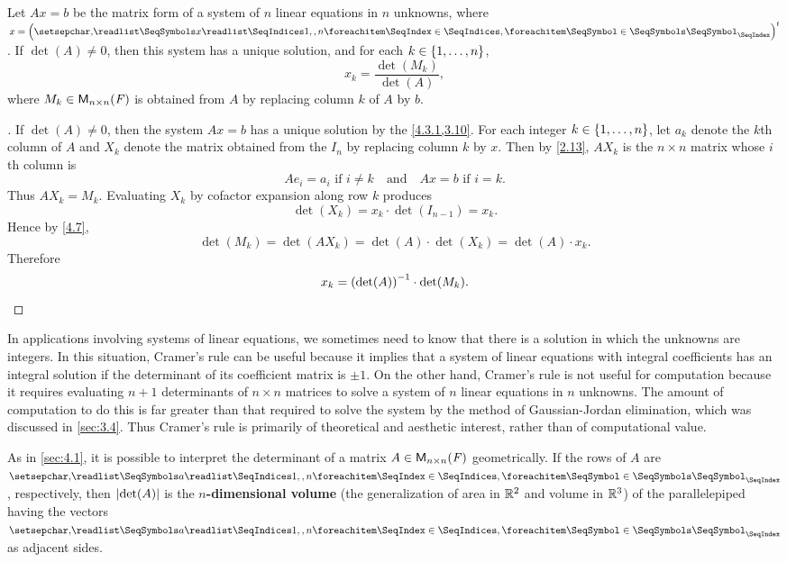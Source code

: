 \begin{thm}\label{4.9}
	Let \(Ax = b\) be the matrix form of a system of \(n\) linear equations in \(n\) unknowns, where \(x = \tp{\tuple{x}{1,,n}}\).
	If \(\det(A) \neq 0\), then this system has a unique solution, and for each \(k \in \left\lbrace1, \dots, n\right\rbrace\),
	\[
		x_k = \frac{\det(M_k)}{\det(A)},
	\]
	where \(M_k \in \mathsf{M}_{{n} \times n}({\mathit{F}})\) is obtained from \(A\) by replacing column \(k\) of \(A\) by \(b\).
\end{thm}

\begin{proof}[]
	If \(\det(A) \neq 0\), then the system \(Ax = b\) has a unique solution by the \cref{4.3.1,3.10}.
	For each integer \(k \in \left\lbrace1, \dots, n\right\rbrace\), let \(a_k\) denote the \(k\)th column of \(A\) and \(X_k\) denote the matrix obtained from the \(I_n\) by replacing column \(k\) by \(x\).
	Then by \cref{2.13}, \(A X_k\) is the \(n \times n\) matrix whose \(i\)th column is
	\[
		A e_i = a_i \text{ if } i \neq k \quad \text{and} \quad Ax = b \text{ if } i = k.
	\]
	Thus \(A X_k = M_k\).
	Evaluating \(X_k\) by cofactor expansion along row \(k\) produces
	\[
		\det(X_k) = x_k \cdot \det(I_{n - 1}) = x_k.
	\]
	Hence by \cref{4.7},
	\[
		\det(M_k) = \det(A X_k) = \det(A) \cdot \det(X_k) = \det(A) \cdot x_k.
	\]
	Therefore
	\[
		x_k = \left\lparen\det(A)\right\rparen^{-1} \cdot \det(M_k).
	\]
\end{proof}

\begin{note}
	In applications involving systems of linear equations, we sometimes need to know that there is a solution in which the unknowns are integers.
	In this situation, Cramer's rule can be useful because it implies that a system of linear equations with integral coefficients has an integral solution if the determinant of its coefficient matrix is \(\pm 1\).
	On the other hand, Cramer's rule is not useful for computation because it requires evaluating \(n + 1\) determinants of \(n \times n\) matrices to solve a system of \(n\) linear equations in \(n\) unknowns.
	The amount of computation to do this is far greater than that required to solve the system by the method of Gaussian-Jordan elimination, which was discussed in \cref{sec:3.4}.
	Thus Cramer's rule is primarily of theoretical and aesthetic interest, rather than of computational value.
\end{note}

\begin{note}
	As in \cref{sec:4.1}, it is possible to interpret the determinant of a matrix \(A \in \mathsf{M}_{{n} \times n}({\mathit{F}})\) geometrically.
	If the rows of \(A\) are \(\seq{a}{1,,n}\), respectively, then \(\left\lvert\det(A)\right\rvert\) is the \textbf{\(n\)-dimensional volume} (the generalization of area in \(\mathbb{R}^2\) and volume in \(\mathbb{R}^3\)) of the parallelepiped having the vectors \(\seq{a}{1,,n}\) as adjacent sides.
\end{note}


